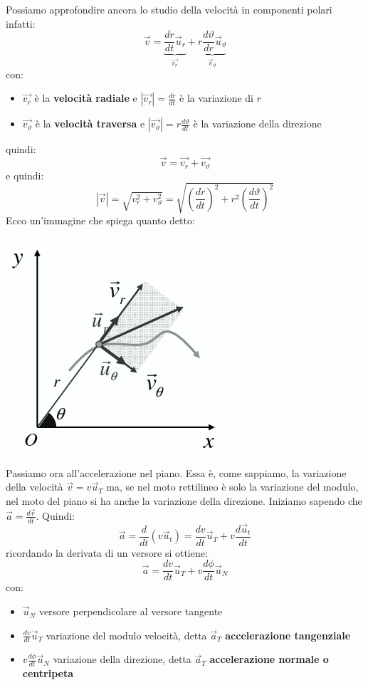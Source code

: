 \documentclass[a4paper,12pt, oneside]{book}
\begin{document}
Possiamo approfondire ancora lo studio della velocità in componenti polari infatti:
$$\vec{v}=\underbrace{\frac{dr}{dt} \vec{u}_r}_{\vec{v_r}}+\underbrace{r\frac{d\vartheta}{dr}\vec{u}_\vartheta}_{\vec{v}_\vartheta}$$
con:
\begin{itemize}
	\item $\vec{v_r}$ è la \textbf{velocità radiale} e $|\vec{v_r}|=\frac{dr}{dt}$  è la variazione di $r$
	\item $\vec{v_\vartheta}$ è la \textbf{velocità traversa} e $|\vec{v_\vartheta}|=r\frac{d\vartheta}{dt}$ è la variazione della direzione
\end{itemize}
quindi:
$$\vec{v}=\vec{v_r}+\vec{v_\vartheta}$$
e quindi:
$$|\vec{v}|=\sqrt{v_r^2+v_\vartheta^2}=\sqrt{\left(\frac{dr}{dt}\right)^2+r^2\left(\frac{d\vartheta}{dt}\right)^2}$$
\newpage
Ecco un'immagine che spiega quanto detto:
\begin{center}
	\includegraphics[scale=0.5]{img/pia7.png}
\end{center}
Passiamo ora all'accelerazione nel piano. Essa è, come sappiamo, la variazione della velocità $\vec{v}=v\vec{u}_T$ ma, se nel moto rettilineo è solo la variazione del modulo, nel moto del piano si ha anche la variazione della direzione. Iniziamo sapendo che $\vec{a}=\frac{d\vec{v}}{dt}$. Quindi:
$$\vec{a}=\frac{d}{dt}(v\vec{u}_t)=\frac{dv}{dt}\vec{u}_T+v\frac{d\vec{u}_t}{dt}$$
ricordando la derivata di un versore si ottiene:
$$\vec{a}=\frac{dv}{dt}\vec{u}_T+v\frac{d\phi}{dt}\vec{u}_N$$
con:
\begin{itemize}
	\item $\vec{u}_N$ versore perpendicolare al versore tangente
	\item $\frac{dv}{dt}\vec{u}_T$ variazione del modulo velocità, detta $\vec{a}_T$ \textbf{accelerazione tangenziale}
	\item $v\frac{d\phi}{dt}\vec{u}_N$ variazione della direzione, detta $\vec{a}_T$ \textbf{accelerazione normale o centripeta}
\end{itemize}
\end{document}
